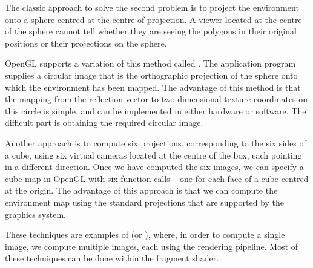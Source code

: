 \documentclass[../COS3712_Notes.tex]{subfiles}
\begin{document}
      The classic approach to solve the second problem is to project the environment
      onto a sphere centred at the centre of projection.
      A viewer located at the centre of the sphere cannot tell whether they are seeing the
      polygons in their original positions or their projections on the sphere.

      OpenGL supports a variation of this method called .
      The application program supplies a circular image that is the orthographic projection
      of the sphere onto which the environment has been mapped.
      The advantage of this method is that the mapping from the reflection vector to
      two-dimensional texture coordinates on this circle is simple, and can be implemented
      in either hardware or software.
      The difficult part is obtaining the required circular image.

      Another approach is to compute six projections, corresponding to the six sides of a cube,
      using six virtual cameras located at the centre of the box, each pointing in a different
      direction.
      Once we have computed the six images, we can specify a cube map in OpenGL with six function
      calls -- one for each face of a cube centred at the origin.
      The advantage of this approach is that we can compute the environment map using the
      standard projections that are supported by the graphics system.

      These techniques are examples of  (or ),
      where, in order to compute a single image, we compute multiple images, each using the
      rendering pipeline.
      Most of these techniques can be done within the fragment shader.
\end{document}

